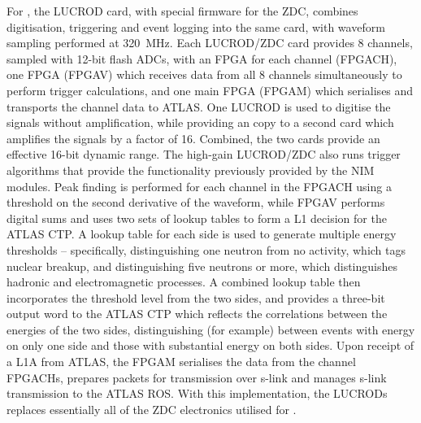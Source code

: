 \documentclass[cernpreprint, atlasdraft=false, UKenglish,british,orcidlogo, texmf, orcidlogo]{atlasdoc}
\begin{document}
For \RunThr, the \gls{LUCROD} card, with special firmware for the \gls{ZDC},
combines digitisation, triggering and event logging into the same
card, with waveform sampling performed at \SI{320}{\MHz}.
Each \gls{LUCROD}/\gls{ZDC} card provides 8 channels, sampled with 12-bit flash \glspl{ADC}, with an \gls{FPGA} for
each channel (\gls{FPGACH}), one \gls{FPGA} (\gls{FPGAV}) which receives data from all 8
channels simultaneously to perform trigger calculations, and one
main \gls{FPGA} (\gls{FPGAM}) which serialises and transports the channel data to ATLAS.
One \gls{LUCROD} is used to digitise the signals without amplification,
while providing an \analog copy to a second card which amplifies the
signals by a factor of 16. Combined, the two cards provide an effective
16-bit dynamic range.  The high-gain \gls{LUCROD}/\gls{ZDC} also runs trigger
algorithms that provide the functionality previously provided by the
\gls{NIM} modules.  Peak finding is performed for each channel in the \gls{FPGACH}
using a threshold on the second derivative of the waveform, while
\gls{FPGAV} performs digital sums and uses two sets of lookup tables to form
a \gls{L1} decision for the ATLAS \gls{CTP}.  A lookup table for each side is used
to generate multiple energy thresholds -- specifically, distinguishing
one neutron from no activity, which tags nuclear breakup, and
distinguishing five neutrons or more, which distinguishes hadronic and
electromagnetic processes.  A combined lookup table then incorporates
the threshold level from the two sides, and provides a three-bit output
word to the ATLAS \gls{CTP} which reflects the correlations between the
energies of the two sides, distinguishing (for example) between events with
energy on only one side and those with substantial energy on both
sides.  Upon receipt of a \gls{L1A} from ATLAS, the \gls{FPGAM}
serialises the data from the channel \glspl{FPGACH}, prepares packets for
transmission over \gls{s-link} and manages \gls{s-link} transmission to the
ATLAS \gls{ROS}.  With this implementation, the \gls{LUCROD}s replaces essentially
all of the \gls{ZDC} electronics utilised for \RunTwo.
 
\end{document}
